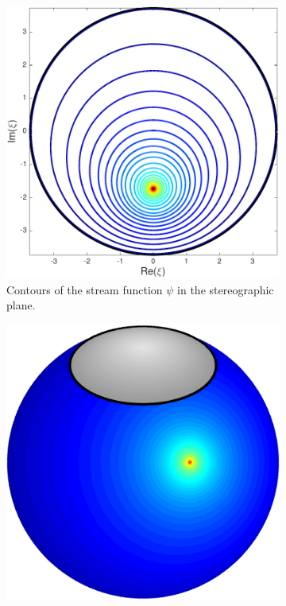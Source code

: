 \documentclass{sfuthesis}
\begin{document}
\begin{figure}[h]
\begin{subfigure}[b]{0.35\textwidth}
                	\includegraphics[width=\textwidth]{Ex6-1CapStreamFnStereo}
               	\caption{Contours of the stream function $\psi$ in the stereographic plane. }
            		\label{fig: Ex6-1CapStreamFnStereo}
       	\end{subfigure} \vspace{0.7cm}
       	\begin{subfigure}[b]{0.35\textwidth}
                	\includegraphics[width=\textwidth]{Ex6-1CapSingPart}

\end{subfigure}
\end{figure}
\end{document}
